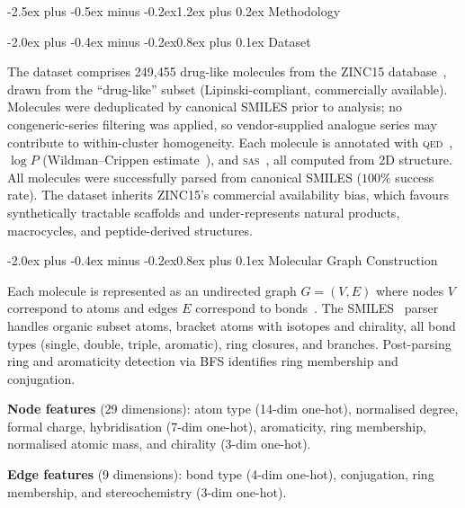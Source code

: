 \documentclass[10pt,a4paper,twocolumn]{article}
\makeatletter
\providecommand{\qed}{}
\let\qed\relax
\newcommand{\qedscore}{\textsc{qed}}
\let\qed\qedscore
\newcommand{\sas}{\textsc{sas}}
\newcommand{\logp}{\ensuremath{\log P}}
\renewcommand\section{\@startsection{section}{1}{\z@}%
  {-2.5ex plus -0.5ex minus -0.2ex}{1.2ex plus 0.2ex}%
  {\normalfont\Large\bfseries}}
\renewcommand\subsection{\@startsection{subsection}{2}{\z@}%
  {-2.0ex plus -0.4ex minus -0.2ex}{0.8ex plus 0.1ex}%
  {\normalfont\large\bfseries}}
\makeatother
\begin{document}
\section{Methodology}
\label{sec:methodology}

\subsection{Dataset}
\label{sec:dataset}

The dataset comprises 249,455 drug-like molecules from the ZINC15 database~\cite{sterling2015}, drawn from the ``drug-like'' subset (Lipinski-compliant, commercially available). Molecules were deduplicated by canonical SMILES prior to analysis; no congeneric-series filtering was applied, so vendor-supplied analogue series may contribute to within-cluster homogeneity. Each molecule is annotated with \qed{}~\cite{bickerton2012}, $\logp{}$ (Wildman--Crippen estimate~\cite{wildman1999}), and \sas{}~\cite{ertl2009}, all computed from 2D structure. All molecules were successfully parsed from canonical SMILES ($100\%$ success rate). The dataset inherits ZINC15's commercial availability bias, which favours synthetically tractable scaffolds and under-represents natural products, macrocycles, and peptide-derived structures.

\subsection{Molecular Graph Construction}
\label{sec:graph-construction}

Each molecule is represented as an undirected graph $G = (V, E)$ where nodes $V$ correspond to atoms and edges $E$ correspond to bonds~\cite{gilmer2017}. The SMILES~\cite{weininger1988} parser handles organic subset atoms, bracket atoms with isotopes and chirality, all bond types (single, double, triple, aromatic), ring closures, and branches. Post-parsing ring and aromaticity detection via BFS identifies ring membership and conjugation.

\textbf{Node features} (29 dimensions): atom type (14-dim one-hot), normalised degree, formal charge, hybridisation (7-dim one-hot), aromaticity, ring membership, normalised atomic mass, and chirality (3-dim one-hot).

\textbf{Edge features} (9 dimensions): bond type (4-dim one-hot), conjugation, ring membership, and stereochemistry (3-dim one-hot).
\end{document}
